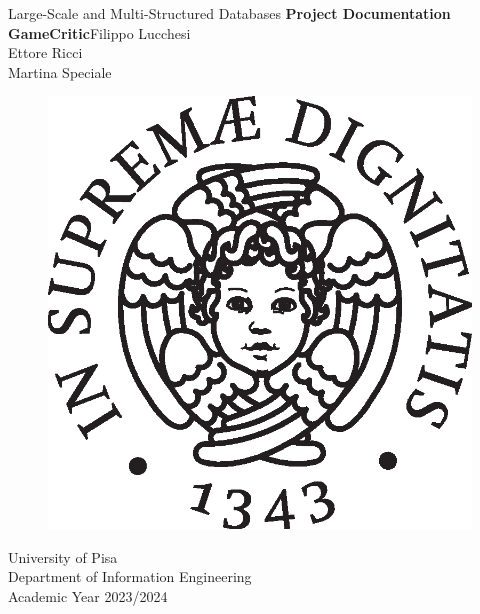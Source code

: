 \begin{titlepage}
	\centering \mbox{} 
	\large Large-Scale and Multi-Structured Databases
	\vfill 
	\Huge \textbf{Project Documentation} \\ \Huge\textbf{GameCritic}\vfill \vfill  \vfill \normalsize Filippo Lucchesi \\ Ettore Ricci \\  Martina Speciale \\\vfill \begin{figure}[h!] \begin{center} \includegraphics[scale=0.5]{cherubino_black.eps}
		\end{center}
	\end{figure}
	
	University of Pisa \\
	Department of Information Engineering \\
	Academic Year 2023/2024
	
\end{titlepage}

\thispagestyle{empty}
\cleardoublepage
